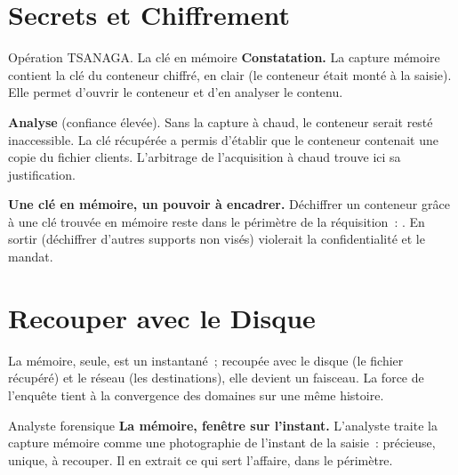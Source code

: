 \section{Secrets et Chiffrement}
\label{sec:c12-secrets}

\begin{boxscenario}{Opération TSANAGA. La clé en mémoire}
\textbf{Constatation.} La capture mémoire contient la clé du conteneur
chiffré, en clair (le conteneur était monté à la saisie). Elle permet d'ouvrir
le conteneur et d'en analyser le contenu.

\medskip
\textbf{Analyse} (confiance élevée). Sans la capture à chaud, le conteneur
serait resté inaccessible. La clé récupérée a permis d'établir que le
conteneur contenait une copie du fichier clients. L'arbitrage de l'acquisition
à chaud trouve ici sa justification.
\end{boxscenario}

\begin{boxCRO}
\textbf{Une clé en mémoire, un pouvoir à encadrer.} Déchiffrer un conteneur
grâce à une clé trouvée en mémoire reste dans le périmètre de la réquisition~:
. En sortir (déchiffrer d'autres supports non visés) violerait la
confidentialité et le mandat.
\end{boxCRO}

\section{Recouper avec le Disque}
\label{sec:c12-recouper}

La mémoire, seule, est un instantané~; recoupée avec le disque (le fichier
récupéré) et le réseau (les destinations), elle devient un faisceau. La force
de l'enquête tient à la convergence des domaines sur une même histoire.

\begin{boxmetier}{Analyste forensique}
\textbf{La mémoire, fenêtre sur l'instant.} L'analyste traite la capture
mémoire comme une photographie de l'instant de la saisie~: précieuse, unique,
à recouper. Il en extrait ce qui sert l'affaire, dans le périmètre.
\end{boxmetier}

